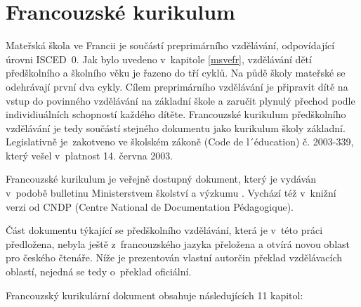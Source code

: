 	\section{Francouzské kurikulum}
	\label{frkurikulum}

		Mateřská škola ve Francii je součástí preprimárního vzdělávání, odpovídající úrovni ISCED~0. Jak bylo uvedeno v~kapitole \ref{msvefr}, vzdělávání dětí předškolního a školního věku je řazeno do tří cyklů. Na půdě školy mateřské se odehrávají první dva cykly. Cílem preprimárního vzdělávání je připravit dítě na vstup do povinného vzdělávání na základní škole a  zaručit plynulý přechod podle individiuálních schopností každého dítěte. Francouzské kurikulum předškolního vzdělávání je tedy součástí stejného dokumentu jako kurikulum školy základní. Legislativně je zakotveno ve školském zákoně (Code de l´éducation) č. 2003-339, který vešel v platnost 14. června 2003.
	
		Francouzské kurikulum je veřejně dostupný dokument, který je vydáván v~podobě bulletinu Ministerstvem školství a výzkumu \citep{buletin}. Vychází též v knižní verzi od CNDP (Centre National de Documentation Pédagogique)\citep{CNDP}.

		Část dokumentu týkající se předškolního vzdělávání, která je v~této práci předložena, nebyla ještě z~francouzského jazyka přeložena a otvírá novou oblast pro českého čtenáře. Níže je prezentován vlastní autorčin překlad vzdělávacích oblastí, nejedná se tedy o~překlad oficiální. 

		Francouzský kurikulární dokument obsahuje následujících 11 kapitol: 

